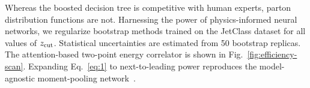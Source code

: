 Whereas the boosted decision tree is competitive with human experts,
parton distribution functions are not. Harnessing the power of
physics-informed neural networks, we regularize bootstrap methods
trained on the JetClass dataset for all values of $z_{\rm cut}$.
Statistical uncertainties are estimated from 50 bootstrap replicas. The
attention-based two-point energy correlator is shown in
Fig.~\ref{fig:efficiency-scan}. Expanding Eq.~\eqref{eq:1} to
next-to-leading power reproduces the model-agnostic moment-pooling
network~\cite{TPC:1201-GLUON-Graph-Based-Leading-Color-Unsupervised-Optimal-Networks-September-18-2026}.


